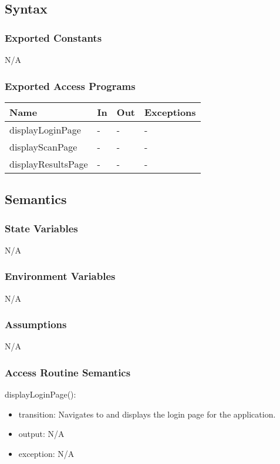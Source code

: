 \documentclass[12pt, titlepage]{article}
\begin{document}
\subsection{Syntax}

\subsubsection{Exported Constants}
N/A
\subsubsection{Exported Access Programs}

\begin{center}
\begin{tabular}{p{4cm} p{3cm} p{3cm} p{3cm}}
\hline
\textbf{Name} & \textbf{In} & \textbf{Out} & \textbf{Exceptions} \\
\hline
displayLoginPage & - & - & - \\
displayScanPage & - & - & - \\
displayResultsPage & - & - & - \\
\hline
\end{tabular}
\end{center}

\subsection{Semantics}

\subsubsection{State Variables}
N/A
\subsubsection{Environment Variables}
N/A
\subsubsection{Assumptions}
N/A
\subsubsection{Access Routine Semantics}

\noindent displayLoginPage():
\begin{itemize}
\item transition: Navigates to and displays the login page for the application.
\item output: N/A 
\item exception: N/A
\end{itemize}
\end{document}
